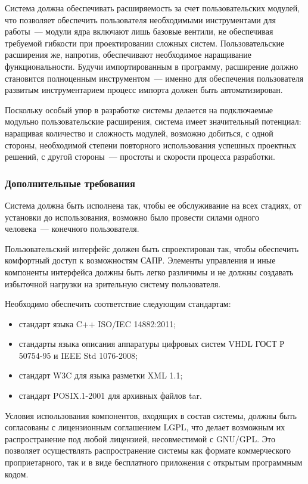 Система должна обеспечивать расширяемость за счет пользовательских модулей, что позволяет обеспечить пользователя необходимыми инструментами для работы~--- модули ядра включают лишь базовые вентили, не обеспечивая требуемой гибкости при проектировании сложных систем.
Пользовательские расширения же, напротив, обеспечивают необходимое наращивание функциональности.
Будучи импортированным в программу, расширение должно становится полноценным инструментом~--- именно для обеспечения пользователя развитым инструментарием процесс импорта должен быть автоматизирован.

Поскольку особый упор в разработке системы делается на подключаемые модульно пользовательские расширения, система имеет значительный потенциал: наращивая количество и сложность модулей, возможно добиться, с одной стороны, необходимой степени повторного использования успешных проектных решений, с другой стороны~--- простоты и скорости процесса разработки.
%
%
\subsubsection{Дополнительные требования} \label{sec:requirements:additional}
Система должна быть исполнена так, чтобы ее обслуживание на всех стадиях, от установки до использования, возможно было провести силами одного человека~--- конечного пользователя.

Пользовательский интерфейс должен быть спроектирован так, чтобы обеспечить комфортный доступ к возможностям САПР.
Элементы управления и иные компоненты интерфейса должны быть легко различимы и не должны создавать избыточной нагрузки на зрительную систему пользователя.

Необходимо обеспечить соответствие следующим стандартам:
\begin{itemize}
  \item стандарт языка C++ ISO/IEC 14882:2011;
  \item стандарты языка описания аппаратуры цифровых систем VHDL ГОСТ Р 50754-95 и IEEE Std 1076-2008;
  \item стандарт W3C для языка разметки XML 1.1;
  \item стандарт POSIX.1-2001 для архивных файлов tar.
\end{itemize}

Условия использования компонентов, входящих в состав системы, должны быть согласованы с лицензионным соглашением LGPL, что делает возможным их распространение под любой лицензией, несовместимой с GNU/GPL. Это позволяет осуществлять распространение системы как формате коммерческого проприетарного, так и в виде бесплатного приложения с открытым программным кодом.
%
%
%
